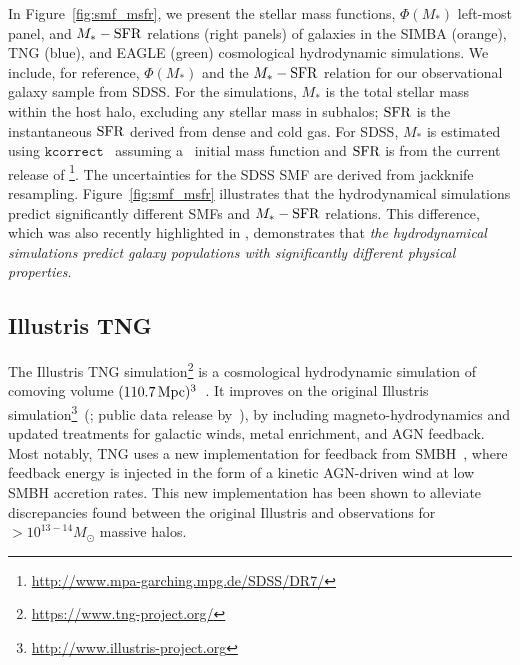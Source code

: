 In Figure~\ref{fig:smf_msfr}, we present the stellar mass functions,
$\Phi(M_*)$ left-most panel, and $M_*-{\rm SFR}$ relations (right panels) of
galaxies in the  SIMBA (orange), TNG (blue), and EAGLE (green) cosmological
hydrodynamic simulations.  We include, for reference, $\Phi(M_*)$ and the 
$M_*-{\rm SFR}$ relation for our observational galaxy sample from SDSS. For the
simulations, $M_*$ is the total stellar mass within the host halo, excluding
any stellar mass in subhalos; ${\rm SFR}$ is the instantaneous ${\rm SFR}$ derived from
dense and cold gas. For SDSS, $M_*$ is estimated using $\mathtt{kcorrect}$~\citep{blanton2007a} 
assuming a~\cite{chabrier2003} initial mass function and ${\rm SFR}$ is from the
current release of \cite{brinchmann2004}\footnote{\url{http://www.mpa-garching.mpg.de/SDSS/DR7/}}.
The uncertainties for the SDSS SMF are derived from jackknife resampling.
Figure~\ref{fig:smf_msfr} illustrates that the hydrodynamical simulations
predict significantly different SMFs and $M_*-{\rm SFR}$ relations. 
This difference, which was also recently highlighted in \cite{hahn2019c}, 
demonstrates that \emph{the hydrodynamical simulations predict galaxy
populations with significantly different physical properties}.

\subsection{Illustris TNG} \label{sec:tng}
The Illustris TNG simulation\footnote{\url{https://www.tng-project.org/}}
is a cosmological hydrodynamic simulation of comoving volume 
$(110.7\,{\rm Mpc})^3$~\citep{nelson2018, pillepich2018, springel2018}. It improves on
the original Illustris simulation\footnote{\url{http://www.illustris-project.org}}~(\citealt{vogelsberger2014, genel2014};
public data release by~\citealt{nelson2015}), by including
magneto-hydrodynamics and updated treatments for galactic winds, metal
enrichment, and AGN feedback. Most notably, TNG uses a new implementation for
feedback from SMBH~\citep{weinberger2018}, where feedback energy is injected in
the form of a kinetic AGN-driven wind at low SMBH accretion rates. This new
implementation has been shown to alleviate discrepancies found between the
original Illustris and observations for $> 10^{13-14} M_\odot$ massive halos. 

